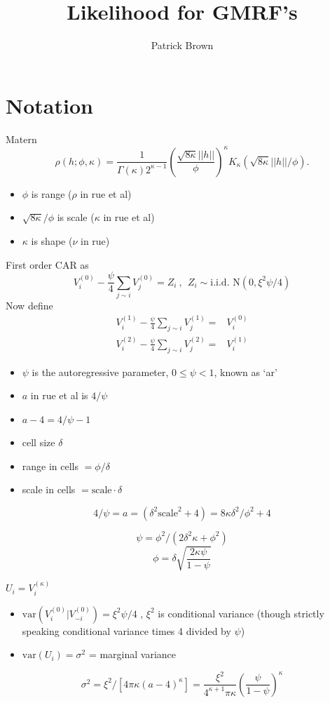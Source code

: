 \documentclass[12pt]{article}
\title{Likelihood for GMRF's}
\author{Patrick Brown}
\begin{document}
\section{Notation}

Matern
\[
\rho(h; \phi, \kappa) = \frac{1}{\Gamma(\kappa)2^{\kappa-1}}\left(\frac{\sqrt{8\kappa}||h||}{\phi}\right)^\kappa
K_\kappa\left(\sqrt{8\kappa}||h||/\phi\right).
\]

\begin{itemize}
  \item $\phi$ is range ($\rho$ in rue et al)
  \item $\sqrt{8\kappa}/\phi$ is scale ($\kappa$ in rue et al)
  \item $\kappa$ is shape ($\nu$ in rue)
\end{itemize}


First order CAR as
\[
V^{(0)}_i - \frac{\psi}{4}\sum_{j\sim i} V^{(0)}_j =  Z_i \ , \ \
Z_i \sim  \text{i.i.d.\ N}(0, \xi^2\psi/4)
\]
Now define
\begin{align*}
V^{(1)}_i - \frac{\psi}{4}\sum_{j\sim i} V^{(1)}_j = & V^{(0)}_i\\
V^{(2)}_i -\frac{\psi}{4}\sum_{j\sim i} V^{(2)}_j = & V^{(1)}_i
\end{align*}


\begin{itemize}
  \item $\psi$ is the autoregressive parameter, $0\leq\psi < 1$, known as `ar' 
  \item $a$ in rue et al is $4/\psi$
  \item $a-4 = 4/\psi-1$ 
  \item cell size $\delta$
    \item range in cells $ = \phi/ \delta$
  \item scale in cells $=\text{scale}\cdot\delta$
\end{itemize}

\[
	4/\psi = a = (\delta^2\text{scale}^2 + 4) = 8 \kappa \delta^2 / \phi^2 + 4
\]

\[
\psi = \phi^2/(2 \delta^2 \kappa + \phi^2)
\]
\[
\phi =  \delta \sqrt{\frac{2\kappa\psi}{1-\psi}}
\]


$U_i = V^{(\kappa)}_i$


\begin{itemize}
  \item $\text{var}(V^{(0)}_i | V^{(0)}_{-i}) = \xi^2\psi/4$ , $\xi^2$ is conditional
  variance (though strictly speaking conditional variance times 4 divided by
  $\psi$)
  \item $\text{var}(U_i) = \sigma^2$ = marginal variance
\end{itemize}
\[
\sigma^2 =  \xi^2/[4\pi\kappa(a-4)^\kappa] = 
\frac{\xi^2}{ 4^{\kappa+1}\pi\kappa} \left(\frac{\psi}{1-\psi}\right)^\kappa
\]
\end{document}
